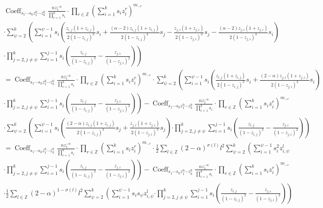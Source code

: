 \documentclass{article}
\newcommand{\lr}[1]{\left({#1}\right)}
\DeclareMathOperator{\Coeff}{Coeff}
\begin{document}
\begin{gather*}
\Coeff_{s_1 \cdots s_{k} z_1^{0} \cdots z^0_{k} } \frac{n z_1^{-n}}{\prod_{i=1}^k s_i}\cdot\prod_{r\in\mathbb{Z}}\lr{\sum_{i=1}^k s_i z_i^r}^{m_{-r}}\\
\cdot\sum_{\psi=2}^k\left(\sum_{i=1}^{\psi-1}s_i\lr{\frac{z_{i,j}(1 + z_{i,j})}{2(1 - z_{i,j})^3} s_i + \frac{(\alpha - 2)z_{i,j}(1 + z_{i,j})}{2(1 - z_{i,j})^3} s_j-\frac{z_{j,i}(1 + z_{j,i})}{2(1 - z_{j,i})^3} s_j - \frac{(\alpha - 2)z_{j,i}(1 + z_{j,i})}{2(1 - z_{j,i})^3} s_i}\right.\\
\left.\cdot\prod_{j=2,j\neq\psi}^k \sum_{i=1}^{j-1} s_i \left( \frac{z_{i,j}}{(1 - z_{i,j})^2} - \frac{z_{j,i}}{(1 - z_{j,i})^2} \right)\right)\\
=\Coeff_{s_1 \cdots s_{k} z_1^{0} \cdots z^0_{k} } \frac{n z_1^{-n}}{\prod_{i=1}^k s_i}\cdot\prod_{r\in\mathbb{Z}}\lr{\sum_{i=1}^k s_i z_i^r}^{m_{-r}}
\cdot\sum_{\psi=2}^k\left(\sum_{i=1}^{\psi-1}s_i\lr{\frac{z_{i,j}(1 + z_{i,j})}{2(1 - z_{i,j})^3} s_i + \frac{(2 - \alpha)z_{j,i}(1 + z_{j,i})}{2(1 - z_{j,i})^3} s_i}\right.\\
\left.\cdot\prod_{j=2,j\neq\psi}^k \sum_{i=1}^{j-1} s_i \left( \frac{z_{i,j}}{(1 - z_{i,j})^2} - \frac{z_{j,i}}{(1 - z_{j,i})^2} \right)\right)
-\Coeff_{s_1 \cdots s_{k} z_1^{0} \cdots z^0_{k} } \frac{n z_1^{-n}}{\prod_{i=1}^k s_i}\cdot\prod_{r\in\mathbb{Z}}\lr{\sum_{i=1}^k s_i z_i^r}^{m_{-r}}\\
\cdot\sum_{\psi=2}^k\left(\sum_{i=1}^{\psi-1}s_i\lr{ \frac{(2 - \alpha)z_{i,j}(1 + z_{i,j})}{2(1 - z_{i,j})^3} s_j + \frac{z_{j,i}(1 + z_{j,i})}{2(1 - z_{j,i})^3} s_j}\right.
\left.\cdot\prod_{j=2,j\neq\psi}^k \sum_{i=1}^{j-1} s_i \left( \frac{z_{i,j}}{(1 - z_{i,j})^2} - \frac{z_{j,i}}{(1 - z_{j,i})^2} \right)\right)\\
=\Coeff_{s_1 \cdots s_{k} z_1^{0} \cdots z^0_{k} } \frac{n z_1^{-n}}{\prod_{i=1}^k s_i}\cdot\prod_{r\in\mathbb{Z}}\lr{\sum_{i=1}^k s_i z_i^r}^{m_{-r}}
\cdot\frac12\sum_{l\in\mathbb{Z}}(2-\alpha)^{\sigma(l)}l^2\sum_{\psi=2}^k\left(\sum_{i=1}^{\psi-1} s_i^2 z_{i,\psi}^l\right.\\
\left.\cdot\prod_{j=2,j\neq\psi}^k \sum_{i=1}^{j-1} s_i \left( \frac{z_{i,j}}{(1 - z_{i,j})^2} - \frac{z_{j,i}}{(1 - z_{j,i})^2} \right)\right)
-\Coeff_{s_1 \cdots s_{k} z_1^{0} \cdots z^0_{k} } \frac{n z_1^{-n}}{\prod_{i=1}^k s_i}\cdot\prod_{r\in\mathbb{Z}}\lr{\sum_{i=1}^k s_i z_i^r}^{m_{-r}}\\
\cdot\frac12\sum_{l\in\mathbb{Z}}(2-\alpha)^{1-\sigma(l)}l^2\sum_{\psi=2}^k\left(\sum_{i=1}^{\psi-1}s_is_\psi z_{i,\psi}^l\right.
\left.\cdot\prod_{j=2,j\neq\psi}^k \sum_{i=1}^{j-1} s_i \left( \frac{z_{i,j}}{(1 - z_{i,j})^2} - \frac{z_{j,i}}{(1 - z_{j,i})^2} \right)\right)\\
\end{gather*}
\end{document}
